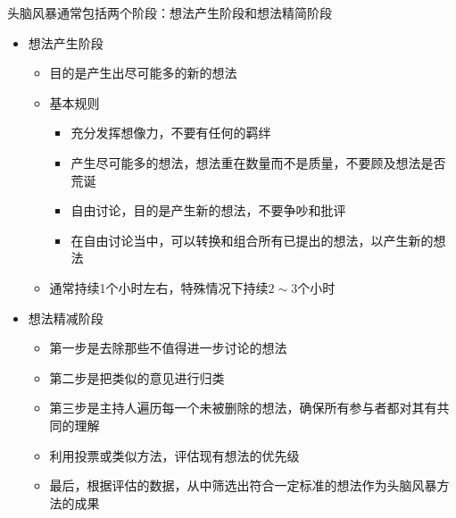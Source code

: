 头脑风暴通常包括两个阶段：想法产生阶段和想法精简阶段
\begin{itemize}
    \item 想法产生阶段
    \begin{itemize}
        \item 目的是产生出尽可能多的新的想法 
        \item 基本规则
        \begin{itemize}
            \item 充分发挥想像力，不要有任何的羁绊
            \item 产生尽可能多的想法，想法重在数量而不是质量，不要顾及想法是否荒诞
            \item 自由讨论，目的是产生新的想法，不要争吵和批评
            \item 在自由讨论当中，可以转换和组合所有已提出的想法，以产生新的想法 
        \end{itemize}
        \item 通常持续1个小时左右，特殊情况下持续$2\sim 3$个小时
    \end{itemize}
    \item 想法精减阶段
    \begin{itemize}
        \item 第一步是去除那些不值得进一步讨论的想法
        \item 第二步是把类似的意见进行归类
        \item 第三步是主持人遍历每一个未被删除的想法，确保所有参与者都对其有共同的理解
        \item 利用投票或类似方法，评估现有想法的优先级
        \item 最后，根据评估的数据，从中筛选出符合一定标准的想法作为头脑风暴方法的成果 
    \end{itemize}
\end{itemize}


